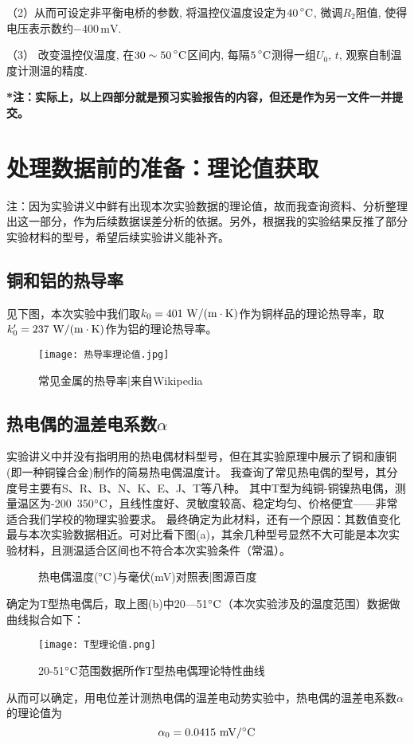 \documentclass[11pt]{article}
\begin{document}
    （2）从而可设定非平衡电桥的参数, 将温控仪温度设定为$ 40\mathop{}\!\mathrm{\prescript{\circ}{}C} $, 微调$ R_2 $阻值, 使得电压表示数约$ -400\,\mathrm{mV} $.

    （3） 改变温控仪温度, 在$ 30\sim 50\mathop{}\!\mathrm{\prescript{\circ}{}C} $区间内, 每隔$ 5\mathop{}\!\mathrm{\prescript{\circ}{}C} $测得一组$ U_0,\,t $, 观察自制温度计测温的精度. 




\bigskip
\textbf{*注：实际上，以上四部分就是预习实验报告的内容，但还是作为另一文件一并提交。}
\bigskip





\section{处理数据前的准备：理论值获取}
{\kaishu 注：因为实验讲义中鲜有出现本次实验数据的理论值，故而我查询资料、分析整理出这一部分，作为后续数据误差分析的依据。另外，根据我的实验结果反推了部分实验材料的型号，希望后续实验讲义能补齐。}

\subsection{铜和铝的热导率}
见下图，本次实验中我们取$k_0=401\,\,{\rm W/(m\cdot K)}$作为铜样品的理论热导率，取$k'_0=237\,\,{\rm W/(m\cdot K)}$作为铝的理论热导率。
\begin{figure}[H]
    \centering
    \texttt{[image: 热导率理论值.jpg]}
    \caption{常见金属的热导率|来自Wikipedia}
\end{figure}


\subsection{热电偶的温差电系数$\alpha$}
实验讲义中并没有指明用的热电偶材料型号，但在其实验原理中展示了铜和康铜(即一种铜镍合金)制作的简易热电偶温度计。
我查询了常见热电偶的型号，其分度号主要有S、R、B、N、K、E、J、T等八种。
其中T型为纯铜-铜镍热电偶，测量温区为-200~350$^\circ \rm C$，且线性度好、灵敏度较高、稳定均匀、价格便宜——非常适合我们学校的物理实验要求。
最终确定为此材料，还有一个原因：其数值变化最与本次实验数据相近。可对比看下图(a)，其余几种型号显然不大可能是本次实验材料，且测温适合区间也不符合本次实验条件（常温）。

\begin{figure}[H] 
    \centering
    \caption{热电偶温度($^\circ \rm C$)与毫伏(mV)对照表|图源百度}
\end{figure}
确定为T型热电偶后，取上图(b)中20—51$^\circ \rm C$（本次实验涉及的温度范围）数据做曲线拟合如下：
\begin{figure}[H]
    \centering
    \texttt{[image: T型理论值.png]}
    \caption{20-51$^\circ \rm C$范围数据所作T型热电偶理论特性曲线}
\end{figure}
从而可以确定，用电位差计测热电偶的温差电动势实验中，热电偶的温差电系数$\alpha$的理论值为
\[
  \alpha_0=0.0415\,\,{\rm mV}/^\circ \rm C  
\]
\end{document}
